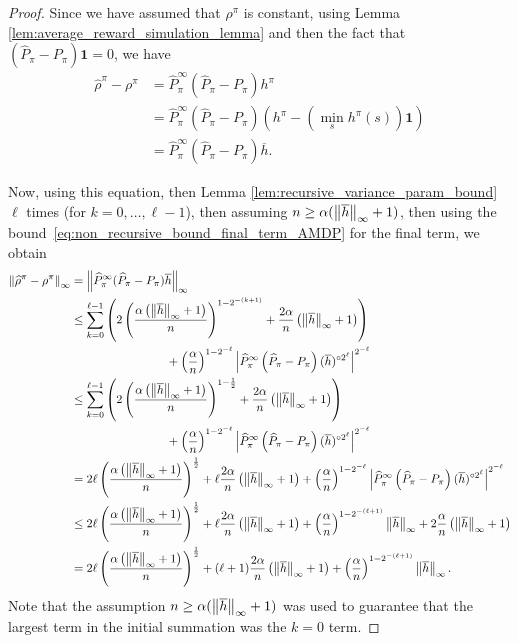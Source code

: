 \documentclass{article}
\theoremstyle{plain}
\theoremstyle{plain}
\theoremstyle{remark}
\theoremstyle{plain}
\theoremstyle{plain}
\newcommand{\Phat}{\widehat{P}}
\newcommand{\one}{\mathbf{1}}
\newcommand{\hc}{\overline{h}}
\newcommand{\rhohat}{\widehat{\rho}}
\begin{document}
\begin{proof}
Since we have assumed that $\rho^\pi$ is constant, using Lemma \ref{lem:average_reward_simulation_lemma} and then the fact that $\left(\Phat_\pi - P_\pi\right) \one = 0$, we have
\begin{align*}
    \rhohat^\pi - \rho^\pi &= \Phat^\infty_\pi (\Phat_\pi - P_\pi) h^\pi \\
    &= \Phat^\infty_\pi (\Phat_\pi - P_\pi) \left( h^{\pi} - \left(\min_s h^{\pi}(s)\right)\one \right) \\
    &= \Phat^\infty_\pi (\Phat_\pi - P_\pi) \hc.
\end{align*}

Now, using this equation, then Lemma \ref{lem:recursive_variance_param_bound} $\ell$ times (for $k = 0, \dots, \ell - 1$), then assuming $n \geq \alpha (\infnorm{\hc} + 1)$, then using the bound~\eqref{eq:non_recursive_bound_final_term_AMDP} for the final term, we obtain
\begin{align}
    \infnorm{\rhohat^\pi - \rho^\pi} & = \infnorm{ \Phat^\infty_\pi (\Phat_\pi - P_\pi) \hc} \nonumber \\
    &\leq \sum_{k=0}^{\ell - 1} \left( 2 \left(\frac{\alpha \left(\infnorm{\hc} + 1\right)}{n} \right)^{1 - 2^{-(k+1)}}+ \frac{2\alpha   }{n}\left(\infnorm{\hc} + 1 \right) \right) \nonumber \\
    & \quad \quad \quad \quad \quad \quad \quad \quad + \left(\frac{\alpha}{n}\right)^{1-2^{-\ell}}  \left|  \Phat_\pi^\infty \left(\Phat_\pi - P_\pi \right) (\hc)^{\circ 2^{\ell} } \right|^{2^{-\ell}} \nonumber \\
    & \leq \sum_{k=0}^{\ell - 1} \left( 2 \left(\frac{\alpha \left(\infnorm{\hc} + 1\right)}{n} \right)^{1 - \frac{1}{2}}+ \frac{2\alpha   }{n}\left(\infnorm{\hc} + 1 \right) \right)  \nonumber \\
     & \quad \quad \quad \quad \quad \quad \quad \quad + \left(\frac{\alpha}{n}\right)^{1-2^{-\ell}}  \left|  \Phat_\pi^\infty \left(\Phat_\pi - P_\pi \right) (\hc)^{\circ 2^{\ell} } \right|^{2^{-\ell}} \nonumber \\
    & =   2 \ell \left(\frac{\alpha \left(\infnorm{\hc} + 1\right)}{n} \right)^{ \frac{1}{2}}+ \ell \frac{2\alpha   }{n}\left(\infnorm{\hc} + 1 \right)  + \left(\frac{\alpha}{n}\right)^{1-2^{-\ell}}  \left|  \Phat_\pi^\infty \left(\Phat_\pi - P_\pi \right) (\hc)^{\circ 2^{\ell} } \right|^{2^{-\ell}} \nonumber \\
    & \leq    2 \ell \left(\frac{\alpha \left(\infnorm{\hc} + 1\right)}{n} \right)^{ \frac{1}{2}}+ \ell \frac{2\alpha   }{n}\left(\infnorm{\hc} + 1 \right)  +    \left(\frac{\alpha}{n}\right)^{1-2^{-(\ell+1)}}  \infnorm{\hc}  + 2\frac{\alpha  }{n}  \left(\infnorm{\hc} + 1 \right) \nonumber \\
    & =    2 \ell \left(\frac{\alpha \left(\infnorm{\hc} + 1\right)}{n} \right)^{ \frac{1}{2}}+ (\ell+1) \frac{2\alpha   }{n}\left(\infnorm{\hc} + 1 \right)  +    \left(\frac{\alpha}{n}\right)^{1-2^{-(\ell+1)}}  \infnorm{\hc} .\label{eq:AMDP_error_bound_penultimate}
\end{align}
Note that the assumption $n \geq \alpha (\infnorm{\hc} + 1)$ was used to guarantee that the largest term in the initial summation was the $k = 0$ term.


\end{proof}
\end{document}
